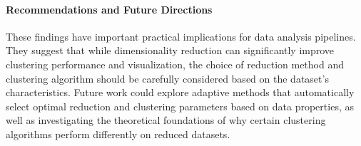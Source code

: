 \paragraph{Recommendations and Future Directions}
These findings have important practical implications for data analysis pipelines. They suggest that while dimensionality reduction can significantly improve clustering performance and visualization, the choice of reduction method and clustering algorithm should be carefully considered based on the dataset's characteristics. Future work could explore adaptive methods that automatically select optimal reduction and clustering parameters based on data properties, as well as investigating the theoretical foundations of why certain clustering algorithms perform differently on reduced datasets.

